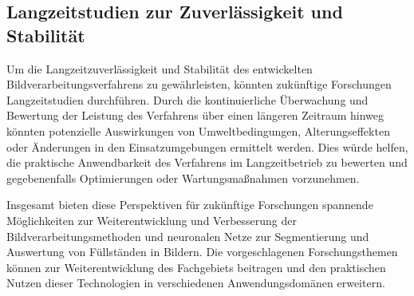 \subsection{Langzeitstudien zur Zuverlässigkeit und Stabilität}

Um die Langzeitzuverlässigkeit und Stabilität des entwickelten Bildverarbeitungsverfahrens zu gewährleisten, könnten zukünftige Forschungen Langzeitstudien durchführen. Durch die kontinuierliche Überwachung und Bewertung der Leistung des Verfahrens über einen längeren Zeitraum hinweg könnten potenzielle Auswirkungen von Umweltbedingungen, Alterungseffekten oder Änderungen in den Einsatzumgebungen ermittelt werden. Dies würde helfen, die praktische Anwendbarkeit des Verfahrens im Langzeitbetrieb zu bewerten und gegebenenfalls Optimierungen oder Wartungsmaßnahmen vorzunehmen.

Insgesamt bieten diese Perspektiven für zukünftige Forschungen spannende Möglichkeiten zur Weiterentwicklung und Verbesserung der Bildverarbeitungsmethoden und neuronalen Netze zur Segmentierung und Auswertung von Füllständen in Bildern. Die vorgeschlagenen Forschungsthemen können zur Weiterentwicklung des Fachgebiets beitragen und den praktischen Nutzen dieser Technologien in verschiedenen Anwendungsdomänen erweitern.
